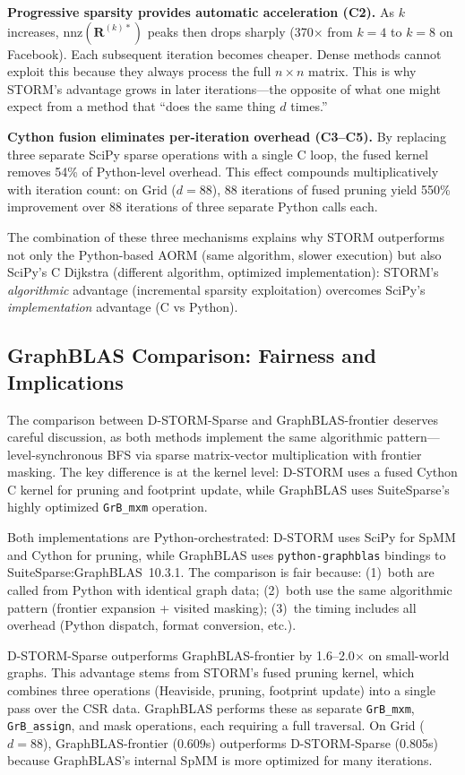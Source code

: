 \documentclass[journal]{IEEEtran}
\begin{document}
\textbf{Progressive sparsity provides automatic acceleration (C2).} As $k$ increases, $\text{nnz}(\mathbf{R}^{(k)*})$ peaks then drops sharply (370$\times$ from $k=4$ to $k=8$ on Facebook). Each subsequent iteration becomes cheaper. Dense methods cannot exploit this because they always process the full $n \times n$ matrix. This is why STORM's advantage grows in later iterations---the opposite of what one might expect from a method that ``does the same thing $d$ times.''

\textbf{Cython fusion eliminates per-iteration overhead (C3--C5).} By replacing three separate SciPy sparse operations with a single C loop, the fused kernel removes 54\% of Python-level overhead. This effect compounds multiplicatively with iteration count: on Grid ($d=88$), 88 iterations of fused pruning yield 550\% improvement over 88 iterations of three separate Python calls each.

The combination of these three mechanisms explains why STORM outperforms not only the Python-based AORM (same algorithm, slower execution) but also SciPy's C Dijkstra (different algorithm, optimized implementation): STORM's \emph{algorithmic} advantage (incremental sparsity exploitation) overcomes SciPy's \emph{implementation} advantage (C vs Python).


\subsection{GraphBLAS Comparison: Fairness and Implications}

The comparison between D-STORM-Sparse and GraphBLAS-frontier deserves careful discussion, as both methods implement the same algorithmic pattern---level-synchronous BFS via sparse matrix-vector multiplication with frontier masking. The key difference is at the kernel level: D-STORM uses a fused Cython C kernel for pruning and footprint update, while GraphBLAS uses SuiteSparse's highly optimized \texttt{GrB\_mxm} operation.

Both implementations are Python-orchestrated: D-STORM uses SciPy for SpMM and Cython for pruning, while GraphBLAS uses \texttt{python-graphblas} bindings to SuiteSparse:GraphBLAS~10.3.1. The comparison is fair because: (1)~both are called from Python with identical graph data; (2)~both use the same algorithmic pattern (frontier expansion + visited masking); (3)~the timing includes all overhead (Python dispatch, format conversion, etc.).

D-STORM-Sparse outperforms GraphBLAS-frontier by 1.6--2.0$\times$ on small-world graphs. This advantage stems from STORM's fused pruning kernel, which combines three operations (Heaviside, pruning, footprint update) into a single pass over the CSR data. GraphBLAS performs these as separate \texttt{GrB\_mxm}, \texttt{GrB\_assign}, and mask operations, each requiring a full traversal. On Grid ($d=88$), GraphBLAS-frontier (0.609s) outperforms D-STORM-Sparse (0.805s) because GraphBLAS's internal SpMM is more optimized for many iterations.
\end{document}
